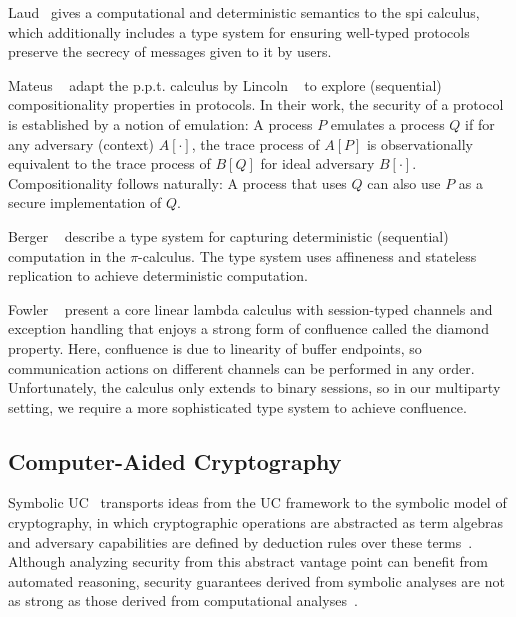 Laud~\cite{laud2005secrecy} gives a computational and deterministic semantics to
the spi calculus, which additionally includes a type system for ensuring
well-typed protocols preserve the secrecy of messages given to it by users.

Mateus \etal~\cite{mateus2003composition} adapt the p.p.t. calculus by Lincoln
\etal~\cite{lincoln1998probabilistic} to explore (sequential) compositionality
properties in protocols. In their work, the security of a protocol is
established by a notion of emulation: A process $P$ emulates a process $Q$ if
for any adversary (context) $A[\cdot]$, the trace process of $A[P]$ is
observationally equivalent to the trace process of $B[Q]$ for ideal adversary
$B[\cdot]$. Compositionality follows naturally: A process that uses $Q$ can also use
$P$ as a secure implementation of $Q$.


Berger \etal~\cite{berger2001sequentiality} describe a type system for capturing
deterministic (sequential) computation in the $\pi$-calculus. The type system uses
affineness and stateless replication to achieve deterministic
computation. 

Fowler \etal~\cite{fowler2018session} present a core linear lambda calculus with
session-typed channels and exception handling that enjoys a strong form of
confluence called the diamond property. Here, confluence is due to linearity of
buffer endpoints, so communication actions on different channels can be
performed in any order. Unfortunately, the calculus only extends to binary
sessions, so in our multiparty setting, we require a more sophisticated type
system to achieve confluence.

\subsection{Computer-Aided Cryptography}
\label{subsec:computer-aided-cryptography}

Symbolic UC~\cite{bohl2016symbolic} transports ideas from the UC framework to
the symbolic model of cryptography, in which cryptographic operations are
abstracted as term algebras and adversary capabilities are defined by deduction
rules over these terms~\cite{cortier2011survey}.  Although analyzing security
from this abstract vantage point can benefit from automated reasoning, security
guarantees derived from symbolic analyses are not as strong as those derived
from computational analyses~\cite{cortier2011survey}.


